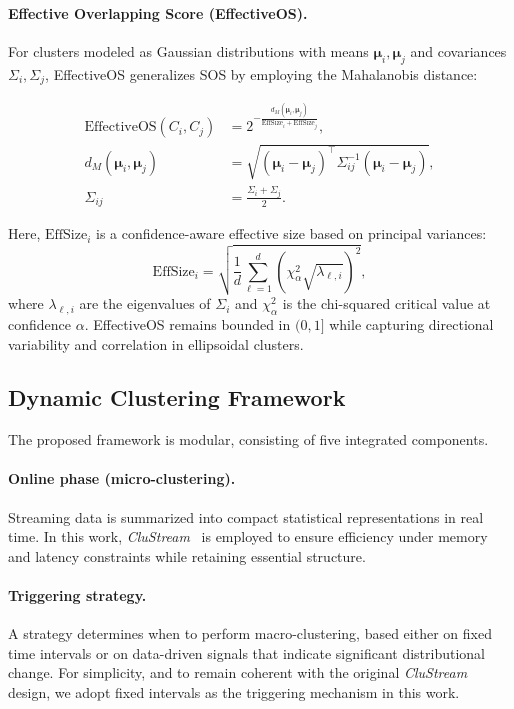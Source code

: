 \paragraph{Effective Overlapping Score (EffectiveOS).}
For clusters modeled as Gaussian distributions with means $\boldsymbol{\mu}_i,
    \boldsymbol{\mu}_j$ and covariances $\Sigma_i, \Sigma_j$, EffectiveOS
generalizes SOS by employing the Mahalanobis distance:

{\scriptsize
\begin{align}
    \text{EffectiveOS}(C_i, C_j)                & = 2^{- \frac{d_M(\boldsymbol{\mu}_i, \boldsymbol{\mu}_j)}{\text{EffSize}_i + \text{EffSize}_j}},                    \\
    d_M(\boldsymbol{\mu}_i, \boldsymbol{\mu}_j) & = \sqrt{(\boldsymbol{\mu}_i - \boldsymbol{\mu}_j)^\top \Sigma_{ij}^{-1} (\boldsymbol{\mu}_i - \boldsymbol{\mu}_j)}, \\
    \Sigma_{ij}                                 & = \frac{\Sigma_i + \Sigma_j}{2}.
\end{align}}

Here, $\text{EffSize}_i$ is a confidence-aware effective size based on
principal variances:
\[
    \text{EffSize}_i = \sqrt{\frac{1}{d} \sum_{\ell=1}^{d} (\chi^2_\alpha \sqrt{\lambda_{\ell,i}})^2},
\]
where $\lambda_{\ell,i}$ are the eigenvalues of $\Sigma_i$ and $\chi^2_\alpha$
is the chi-squared critical value at confidence $\alpha$. EffectiveOS remains
bounded in $(0,1]$ while capturing directional variability and correlation in
ellipsoidal clusters.

\subsection{Dynamic Clustering Framework}
The proposed framework is modular, consisting of five integrated components.

\paragraph{Online phase (micro-clustering).}
Streaming data is summarized into compact statistical representations in real
time. In this work, \textit{CluStream}~\cite{clustream} is employed to ensure
efficiency under memory and latency constraints while retaining essential
structure.

\paragraph{Triggering strategy.}  
A strategy determines when to perform macro-clustering, based either on fixed
time intervals or on data-driven signals that indicate significant
distributional change. For simplicity, and to remain coherent with the original
\textit{CluStream} design, we adopt fixed intervals as the triggering mechanism
in this work.

